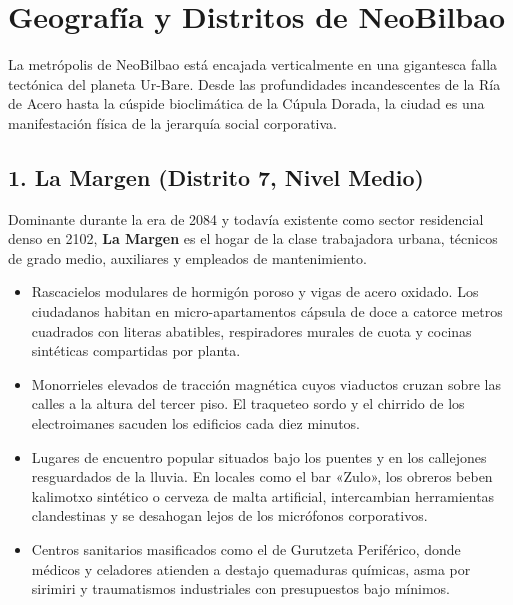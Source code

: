 \chapter{Geografía y Distritos de NeoBilbao}


La metrópolis de NeoBilbao está encajada verticalmente en una gigantesca falla tectónica del planeta Ur-Bare. Desde las profundidades incandescentes de la Ría de Acero hasta la cúspide bioclimática de la Cúpula Dorada, la ciudad es una manifestación física de la jerarquía social corporativa.

\section{1. La Margen (Distrito 7, Nivel Medio)}

Dominante durante la era de 2084 y todavía existente como sector residencial denso en 2102, \textbf{La Margen} es el hogar de la clase trabajadora urbana, técnicos de grado medio, auxiliares y empleados de mantenimiento.

\begin{itemize}
  \item {} Rascacielos modulares de hormigón poroso y vigas de acero oxidado. Los ciudadanos habitan en micro-apartamentos cápsula de doce a catorce metros cuadrados con literas abatibles, respiradores murales de cuota y cocinas sintéticas compartidas por planta.
  \item {} Monorrieles elevados de tracción magnética cuyos viaductos cruzan sobre las calles a la altura del tercer piso. El traqueteo sordo y el chirrido de los electroimanes sacuden los edificios cada diez minutos.
  \item {} Lugares de encuentro popular situados bajo los puentes y en los callejones resguardados de la lluvia. En locales como el bar «Zulo», los obreros beben kalimotxo sintético o cerveza de malta artificial, intercambian herramientas clandestinas y se desahogan lejos de los micrófonos corporativos.
  \item {} Centros sanitarios masificados como el de Gurutzeta Periférico, donde médicos y celadores atienden a destajo quemaduras químicas, asma por sirimiri y traumatismos industriales con presupuestos bajo mínimos.
\end{itemize}

